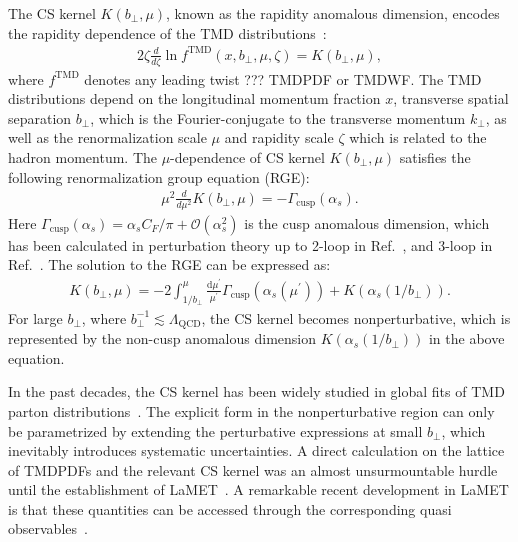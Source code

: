 \documentclass[prd,aps,twocolumn,preprintnumbers, showpacs, nofootinbib,superscriptaddress,notitlepage]{revtex4-1}
\newcommand{\red}[1]{\textcolor{red}{#1}} %
\newcommand\bl{\color{blue}}
\begin{document}
The CS kernel $K\left(b_{\perp}, \mu\right)$, known as the rapidity anomalous dimension, encodes the rapidity dependence  of the TMD distributions~\cite{Collins:1981va,Collins:1981uk}:
\begin{align}
	2 \zeta \frac{d}{d \zeta} \ln f^{\mathrm{TMD}}\left(x, b_{\perp}, \mu, \zeta\right)=K\left(b_{\perp}, \mu\right), \label{eq:TMDsrapidityevolution}
\end{align}
where $f^{\mathrm{TMD}}$ denotes {\bl any leading twist ??? TMDPDF or TMDWF. The} TMD distributions depend on the longitudinal momentum fraction $x$, transverse spatial separation $b_{\perp}$, which is the Fourier-conjugate to the transverse momentum $k_{\perp}$, as well as the renormalization scale $\mu$ and rapidity scale $\zeta$ {which is related to the hadron momentum}. The $\mu$-dependence of CS kernel $K\left(b_{\perp}, \mu\right)$ satisfies the following renormalization group equation (RGE):
\begin{align}
	\mu^{2} \frac{d}{d \mu^{2}} K\left(b_{\perp}, \mu\right)=-\Gamma_{\text {cusp}}\left(\alpha_{s}\right).  \label{eq:cuspanomalousdimension}
\end{align}
Here $\Gamma_{\text {cusp}}\left(\alpha_{s}\right)=\alpha_sC_F/\pi+\mathcal{O}(\alpha_s^2)$ is the cusp anomalous dimension, {\bl which} has been calculated  in  perturbation theory  up to 2-loop in Ref.~\cite{Li:2016ctv}, and 3-loop in Ref.~\cite{Moch:2017uml}. The solution to  the RGE  can be expressed as: 
\begin{align}
	K\left(b_{\perp}, \mu\right)=-2 \int_{1 / b_{\perp}}^{\mu} \frac{\mathrm{d} \mu^{\prime}}{\mu^{\prime}} \Gamma_{\text {cusp}}\left(\alpha_{s}\left(\mu^{\prime}\right)\right)+K\left(\alpha_{s}\left(1 / b_{\perp}\right)\right). 
	\label{eq:nonper-per-CS-kernel}
\end{align} 
{\bl For large $b_{\perp}$}, where $b_{\perp}^{-1}\lesssim\Lambda_{\mathrm{QCD}}$, the CS kernel becomes nonperturbative, which is  represented by the non-cusp anomalous dimension $K\left(\alpha_{s}\left(1/b_{\perp}\right)\right)$ in the above equation. 

In the past decades, the CS kernel has  been widely studied in global fits of  TMD parton distributions~\cite{Landry:1999an,Landry:2002ix,DAlesio:2014mrz,Sun:2014dqm,Konychev:2005iy,Bacchetta:2017gcc,Scimemi:2017etj,Scimemi:2019cmh,Bacchetta:2019sam}. The explicit form in the nonperturbative region can only be parametrized by extending the perturbative expressions at  small {\bl $b_{\perp}$}, which inevitably introduces systematic uncertainties. A direct calculation on the lattice  of TMDPDFs and the relevant CS kernel {\bl was an almost unsurmountable hurdle} until the establishment  of LaMET~\cite{Ji:2013dva,Ji:2014gla}.  A remarkable {\bl recent development} in LaMET is that  these quantities  can    be accessed through the corresponding quasi observables~\cite{Ebert:2019okf,Ji:2019sxk,Ji:2019ewn,Ji:2021znw}.
\end{document}
